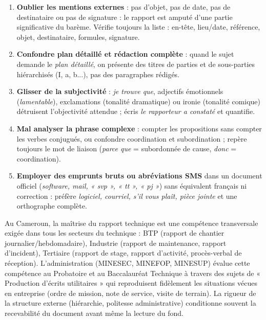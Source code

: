 \documentclass[11pt]{article}
\begin{document}
\begin{attention}
\begin{enumerate}
\item \textbf{Oublier les mentions externes} : pas d'objet, pas de date, pas de destinataire ou pas de signature : le rapport est amputé d'une partie significative du barème. Vérifie toujours la liste : en-tête, lieu/date, référence, objet, destinataire, formules, signature.
\item \textbf{Confondre plan détaillé et rédaction complète} : quand le sujet demande le \emph{plan détaillé}, on présente des titres de parties et de sous-parties hiérarchisés (I, a, b...), pas des paragraphes rédigés.
\item \textbf{Glisser de la subjectivité} : \emph{je trouve que}, adjectifs émotionnels (\emph{lamentable}), exclamations (tonalité dramatique) ou ironie (tonalité comique) détruisent l'objectivité attendue ; écris \emph{le rapporteur a constaté} et quantifie.
\item \textbf{Mal analyser la phrase complexe} : compter les propositions sans compter les verbes conjugués, ou confondre coordination et subordination ; repère toujours le mot de liaison (\emph{parce que} = subordonnée de cause, \emph{donc} = coordination).
\item \textbf{Employer des emprunts bruts ou abréviations SMS} dans un document officiel (\emph{software, mail, « svp », « tt », « pj »}) sans équivalent français ni correction : préfère \emph{logiciel, courriel, s'il vous plaît, pièce jointe} et une orthographe complète.
\end{enumerate}
\end{attention}

\begin{savaistu}
Au Cameroun, la maîtrise du rapport technique est une compétence transversale exigée dans tous les secteurs du technique : BTP (rapport de chantier journalier/hebdomadaire), Industrie (rapport de maintenance, rapport d'incident), Tertiaire (rapport de stage, rapport d'activité, procès-verbal de réception). L'administration (MINESEC, MINEFOP, MINESUP) évalue cette compétence au Probatoire et au Baccalauréat Technique à travers des sujets de « Production d'écrits utilitaires » qui reproduisent fidèlement les situations vécues en entreprise (ordre de mission, note de service, visite de terrain). La rigueur de la structure externe (hiérarchie, politesse administrative) conditionne souvent la recevabilité du document avant même la lecture du fond.
\end{savaistu}
\end{document}
